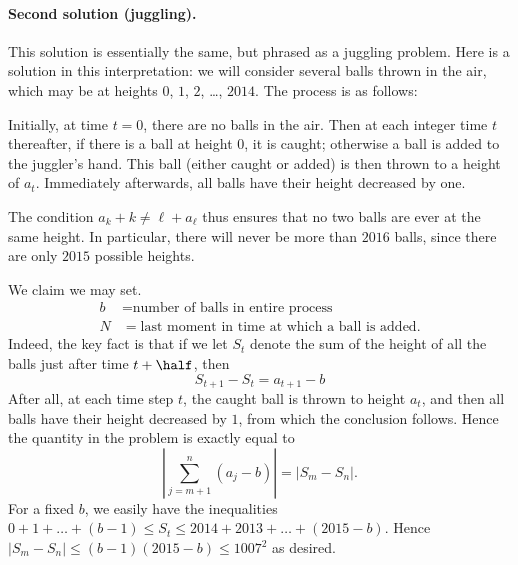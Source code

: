\paragraph{Second solution (juggling).}
This solution is essentially the same, but phrased as a juggling problem.
Here is a solution in this interpretation:
we will consider several balls thrown in the air,
which may be at heights $0$, $1$, $2$, \dots, $2014$.
The process is as follows:
\begin{itemize}
\ii Initially, at time $t = 0$, there are no balls in the air.
\ii Then at each integer time $t$ thereafter,
if there is a ball at height $0$, it is caught;
otherwise a ball is added to the juggler's hand.
This ball (either caught or added) is then thrown to a height of $a_t$.
\ii Immediately afterwards, all balls have their height decreased by one.
\end{itemize}
The condition $a_k + k \neq \ell + a_\ell$ thus ensures that
no two balls are ever at the same height.
In particular, there will never be more than $2016$ balls,
since there are only $2015$ possible heights.

We claim we may set.
\begin{align*}
  b &= \text{number of balls in entire process} \\
  N &= \text{last moment in time at which a ball is added}.
\end{align*}
Indeed, the key fact is that if we let $S_t$ denote
the sum of the height of all the balls just after time $t+\half$, then
\[ S_{t+1} - S_t = a_{t+1} - b \]
After all, at each time step $t$, the caught ball is thrown to height $a_t$,
and then all balls have their height decreased by $1$,
from which the conclusion follows.
Hence the quantity in the problem is exactly equal to
\[ \left\lvert\sum_{j=m+1}^n (a_j-b) \right\rvert
  = \left\lvert S_m - S_n \right\rvert. \]
For a fixed $b$, we easily have the inequalities
$0 + 1 + \dots + (b-1) \le S_t \le 2014 + 2013 + \dots + (2015-b)$.
Hence $|S_m - S_n| \le (b-1)(2015-b) \le 1007^2$ as desired.
\pagebreak



